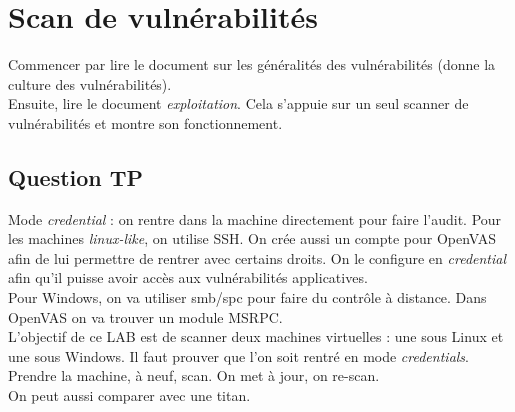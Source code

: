 \section{Scan de vulnérabilités}
Commencer par lire le document sur les généralités des vulnérabilités (donne la culture des vulnérabilités).\\
Ensuite, lire le document \textit{exploitation}. Cela s'appuie sur un seul scanner de vulnérabilités et montre son fonctionnement.\\
\subsection{Question TP}
Mode \textit{credential} : on rentre dans la machine directement pour faire l'audit. Pour les machines \textit{linux-like}, on utilise SSH. On crée aussi un compte pour OpenVAS afin de lui permettre de rentrer avec certains droits. On le configure en \textit{credential} afin qu'il puisse avoir accès aux vulnérabilités applicatives.\\
Pour Windows, on va utiliser smb/spc pour faire du contrôle à distance. Dans OpenVAS on va trouver un module MSRPC.\\
L'objectif de ce LAB est de scanner deux machines virtuelles : une sous Linux et une sous Windows. Il faut prouver que l'on soit rentré en mode \textit{credentials}.\\
Prendre la machine, à neuf, scan. On met à jour, on re-scan.\\
On peut aussi comparer avec une titan.